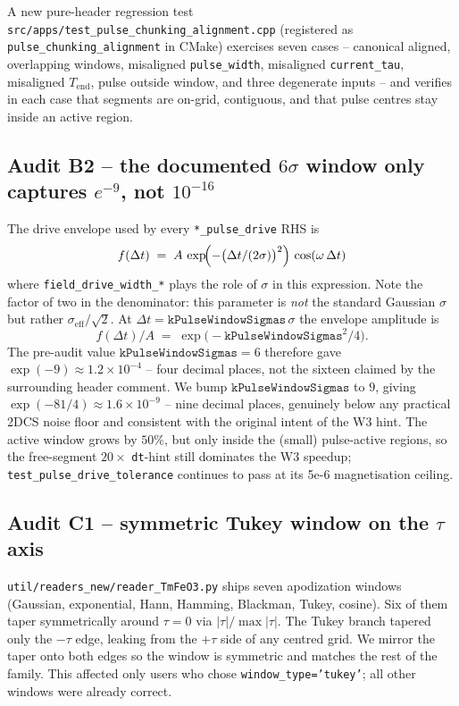 \documentclass[11pt,letterpaper]{article}
\begin{document}
A new pure-header regression test
\texttt{src/apps/test\_pulse\_chunking\_alignment.cpp} (registered
as \texttt{pulse\_chunking\_alignment} in CMake) exercises seven
cases -- canonical aligned, overlapping windows, misaligned
\texttt{pulse\_width}, misaligned \texttt{current\_tau}, misaligned
$T_\text{end}$, pulse outside window, and three degenerate inputs --
and verifies in each case that segments are on-grid, contiguous,
and that pulse centres stay inside an active region.

\subsection*{Audit B2 -- the documented $6\sigma$ window only
captures $e^{-9}$, not $10^{-16}$}

The drive envelope used by every \texttt{*\_pulse\_drive} RHS is
\[
  f(\Delta t) \;=\; A \, \exp\!\Bigl(-\bigl(\Delta t / (2\sigma)\bigr)^{2}\Bigr)
              \, \cos(\omega \, \Delta t)
\]
where \texttt{field\_drive\_width\_*} plays the role of $\sigma$ in
this expression.  Note the factor of two in the denominator: this
parameter is \emph{not} the standard Gaussian $\sigma$ but rather
$\sigma_\text{eff}/\sqrt{2}$.  At
$\Delta t = \texttt{kPulseWindowSigmas}\,\sigma$ the envelope
amplitude is
\[
  f(\Delta t) / A \;=\; \exp\!\bigl(-\texttt{kPulseWindowSigmas}^{2}/4\bigr).
\]
The pre-audit value $\texttt{kPulseWindowSigmas} = 6$ therefore gave
$\exp(-9) \approx 1.2 \times 10^{-4}$ -- four decimal places, not
the sixteen claimed by the surrounding header comment.  We bump
$\texttt{kPulseWindowSigmas}$ to $9$, giving
$\exp(-81/4) \approx 1.6 \times 10^{-9}$ -- nine decimal places,
genuinely below any practical 2DCS noise floor and consistent with
the original intent of the W3 hint.  The active window grows by
$50\%$, but only inside the (small) pulse-active regions, so the
free-segment $20\times$ \texttt{dt}-hint still dominates the W3
speedup; \texttt{test\_pulse\_drive\_tolerance} continues to pass at
its 5e-6 magnetisation ceiling.

\subsection*{Audit C1 -- symmetric Tukey window on the $\tau$ axis}

\texttt{util/readers\_new/reader\_TmFeO3.py} ships seven
apodization windows (Gaussian, exponential, Hann, Hamming, Blackman,
Tukey, cosine).  Six of them taper symmetrically around $\tau = 0$
via $|\tau|/\max|\tau|$.  The Tukey branch tapered only the $-\tau$
edge, leaking from the $+\tau$ side of any centred grid.  We mirror
the taper onto both edges so the window is symmetric and matches
the rest of the family.  This affected only users who chose
\texttt{window\_type='tukey'}; all other windows were already
correct.
\end{document}
